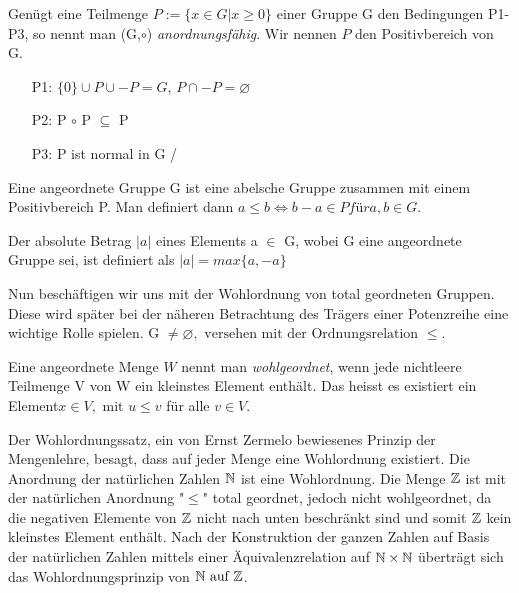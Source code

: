 %
%
%
\begin{bem}\label{afG}
%
Genügt eine Teilmenge $P := \lbrace x \in G | x \geqslant 0\rbrace$ einer Gruppe G den Bedingungen P1- P3, so nennt man (G,$\circ $) \textit{anordnungsfähig}. Wir nennen $P$ den Positivbereich von G.
%
\begin{enumerate}
\item[P1:] $\lbrace0\rbrace \cup P\cup -P = G$, $P \cap -P = \varnothing$ 
\item[P2:] P $\circ$ P $\subseteq$ P
\item[P3:] P ist normal in G / %
\end{enumerate}
\end{bem}
%
\begin{bem}\label{angeordnetAbelsch}
Eine angeordnete Gruppe G ist eine abelsche Gruppe zusammen mit einem Positivbereich P. Man definiert dann $a \leq b \Leftrightarrow b - a \in P für a, b \in G$.
\end{bem}
\begin{defn} \label{betrag}
Der absolute Betrag $|a|$ eines Elements a $\in $ G, wobei G eine angeordnete Gruppe sei, ist definiert als $|a| = max\lbrace a, -a \rbrace$
\end{defn}
%
Nun beschäftigen wir uns mit der Wohlordnung von total geordneten Gruppen. Diese wird später bei der näheren Betrachtung des Trägers einer Potenzreihe eine wichtige Rolle spielen.
G $\neq \varnothing, \text{ versehen mit der Ordnungsrelation }\leqslant$. 
\begin{defn} \label{wohlgeordn}
Eine angeordnete Menge $W$ nennt man \textit{wohlgeordnet}, wenn jede nichtleere Teilmenge V von W ein kleinstes Element enthält. Das heisst es existiert ein Element$ x \in V, \text{ mit } u \le v $ für alle $ v \in V.$ \cite{fuchs66} 
\end{defn}
%
Der Wohlordnungssatz, ein von Ernst Zermelo bewiesenes Prinzip der Mengenlehre, besagt, dass auf jeder Menge eine Wohlordnung existiert. Die Anordnung der natürlichen Zahlen $ \mathbb{N}$ ist eine Wohlordnung. Die Menge $\mathbb{Z}$ ist mit der natürlichen Anordnung "$\leqslant$" total geordnet, jedoch nicht wohlgeordnet, da die negativen Elemente von $\mathbb{Z}$ nicht nach unten beschränkt sind und somit $\mathbb{Z}$ kein kleinstes Element enthält. Nach der Konstruktion der ganzen Zahlen auf Basis der natürlichen Zahlen mittels einer Äquivalenzrelation auf $\mathbb{N} \times \mathbb{N}$  überträgt sich das Wohlordnungsprinzip von $\mathbb{N} \text{ auf } \mathbb{Z}$.
